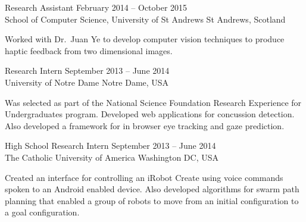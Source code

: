 \documentclass[line,margin]{cv}
\begin{document}
\begin{resume}
Research Assistant
\hfill February 2014 -- October 2015 \\
School of Computer Science, University of St Andrews \hfill St Andrews,
Scotland

\begin{adjustwidth}{2.5em}{2.5em}

    Worked with Dr.\ Juan Ye to develop computer vision techniques to produce
    haptic feedback from two dimensional images.

\end{adjustwidth}

% 
% 
% 

\newpage

Research Intern
\hfill September 2013 -- June 2014 \\
University of Notre Dame \hfill Notre Dame, USA

\begin{adjustwidth}{2.5em}{2.5em}

    Was selected as part of the National Science Foundation Research Experience
    for Undergraduates program. Developed web applications for concussion
    detection. Also developed a framework for in browser eye tracking and gaze
    prediction.

\end{adjustwidth}

High School Research Intern
\hfill September 2013 -- June 2014 \\
The Catholic University of America \hfill Washington DC, USA

\begin{adjustwidth}{2.5em}{2.5em}

    Created an interface for controlling an iRobot Create using voice commands
    spoken to an Android enabled device. Also developed algorithms for swarm
    path planning that enabled a group of robots to move from an initial
    configuration to a goal configuration.

\end{adjustwidth}


\end{resume}
\end{document}
